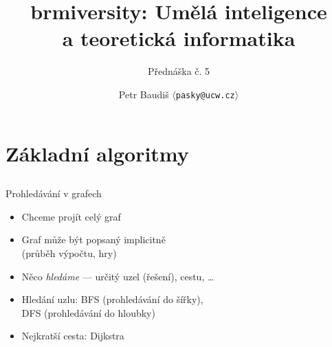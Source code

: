 \documentclass{beamer}
\begin{document}

\title{brmiversity: Umělá inteligence \\ a teoretická informatika}
\subtitle{Přednáška č. 5}
\author{Petr Baudiš $\langle${\tt pasky@ucw.cz}$\rangle$}
\date{}
\frame{\titlepage}

\section{Základní algoritmy}

\subsection{}
\begin{frame}{Prohledávání v grafech}
\begin{itemize}
\item Chceme projít celý graf
\item Graf může být popsaný implicitně \\ (průběh výpočtu, hry)
\item Něco {\em hledáme} --- určitý uzel (řešení), cestu, \dots
\item Hledání uzlu: BFS (prohledávání do šířky), \\ DFS (prohledávání do hloubky)
\item Nejkratší cesta: Dijkstra
\end{itemize}
\end{frame}
\end{document}
